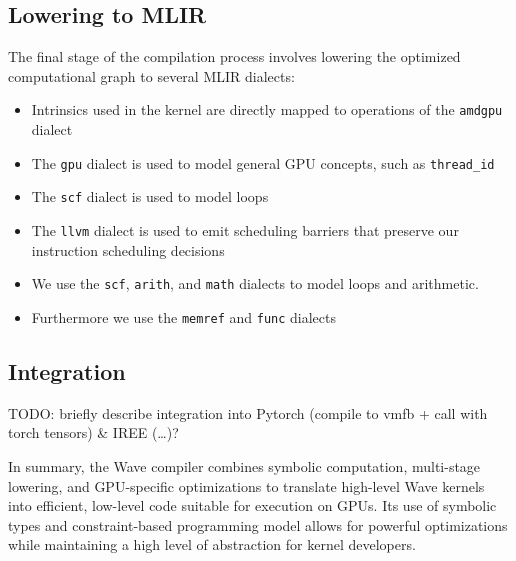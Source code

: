 \documentclass{article}
\begin{document}
\subsection{Lowering to MLIR}


The final stage of the compilation process involves lowering the optimized computational graph to several MLIR dialects: %

\begin{itemize}
    \item Intrinsics used in the kernel are directly mapped to operations of the \texttt{\footnotesize amdgpu} dialect
    \item The \texttt{\footnotesize gpu} dialect is used to model general GPU concepts, such as \texttt{\footnotesize thread\_id}
    \item The \texttt{\footnotesize scf} dialect is used to model loops
    \item The \texttt{\footnotesize llvm} dialect is used to emit scheduling barriers that preserve our instruction scheduling decisions
    \item We use the \texttt{\footnotesize scf}, \texttt{\footnotesize arith}, and \texttt{\footnotesize math} dialects to model loops and arithmetic.
    \item Furthermore we use the \texttt{\footnotesize memref} and \texttt{\footnotesize func} dialects
\end{itemize}




\subsection{Integration}
TODO: briefly describe integration into Pytorch (compile to vmfb + call with torch tensors) \& IREE (\ldots)?



\bigskip
In summary, the Wave compiler combines symbolic computation, multi-stage lowering, and GPU-specific optimizations to translate high-level Wave kernels into efficient, low-level code suitable for execution on GPUs. Its use of symbolic types and constraint-based programming model allows for powerful optimizations while maintaining a high level of abstraction for kernel developers.
\end{document}

